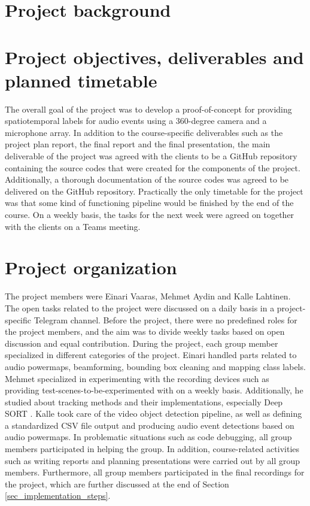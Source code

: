 \section{Project background}


\section{Project objectives, deliverables and planned timetable}

The overall goal of the project was to develop a proof-of-concept for providing spatiotemporal labels for audio events using a 360-degree camera and a microphone array. In addition to the course-specific deliverables such as the project plan report, the final report and the final presentation, the main deliverable of the project was agreed with the clients to be a GitHub repository containing the source codes that were created for the components of the project. Additionally, a thorough documentation of the source codes was agreed to be delivered on the GitHub repository. Practically the only timetable for the project was that some kind of functioning pipeline would be finished by the end of the course. On a weekly basis, the tasks for the next week were agreed on together with the clients on a Teams meeting.

\section{Project organization}

The project members were Einari Vaaras, Mehmet Aydin and Kalle Lahtinen. The open tasks related to the project were discussed on a daily basis in a project-specific Telegram channel. Before the project, there were no predefined roles for the project members, and the aim was to divide weekly tasks based on open discussion and equal contribution. During the project, each group member specialized in different categories of the project. Einari handled parts related to audio powermaps, beamforming, bounding box cleaning and mapping class labels. Mehmet specialized in experimenting with the recording devices such as providing test-scenes-to-be-experimented with on a weekly basis. Additionally, he studied about tracking methods and their implementations, especially Deep SORT \cite{deepsort}. Kalle took care of the video object detection pipeline, as well as defining a standardized CSV file output and producing audio event detections based on audio powermaps. In problematic situations such as code debugging, all group members participated in helping the group. In addition, course-related activities such as writing reports and planning presentations were carried out by all group members. Furthermore, all group members participated in the final recordings for the project, which are further discussed at the end of Section \ref{sec_implementation_steps}.


